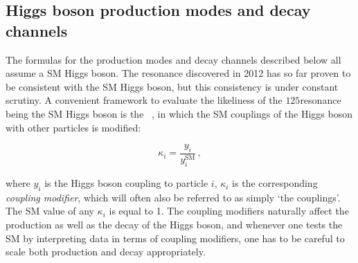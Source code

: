 \subsection{Higgs boson production modes and decay channels}

The formulas for the production modes and decay channels described below all assume a SM Higgs boson.
% 
The resonance discovered in 2012 has so far proven to be consistent with the SM Higgs boson, but this consistency is under constant scrutiny.
% 
A convenient framework to evaluate the likeliness of the $125$\GeV resonance being the SM Higgs boson is the \textit{\kappaframework}~\cite{LHCHXSWG:YR3}, in which the SM couplings of the Higgs boson with other particles is modified:
% 
\begin{linenomath*}
\begin{equation}
\kappa_{i} = \frac{y_{i}}{y_{i}^{\text{SM}}}\,,
\end{equation}
\end{linenomath*}
% 
where $y_i$ is the Higgs boson coupling to particle $i$, $\kappa_i$ is the corresponding \textit{coupling modifier}, which will often also be referred to as simply `the couplings'.
% 
The SM value of any $\kappa_i$ is equal to 1.
% 
The coupling modifiers naturally affect the production as well as the decay of the Higgs boson, and whenever one tests the SM by interpreting data in terms of coupling modifiers, one has to be careful to scale both production and decay appropriately.



